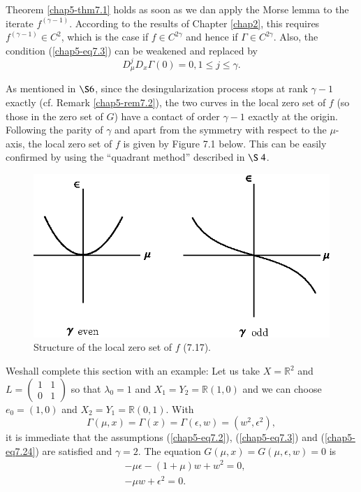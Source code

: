 \begin{remark}\label{chap5-rem7.3}
Theorem \ref{chap5-thm7.1} holds as soon as we dan apply the Morse
lemma to the iterate $f^{(\gamma - 1)}$. According to the results of
Chapter \ref{chap2}, this requires $f^{(\gamma - 1)} \in C^{2}$,
which is the case if $f \in C^{2 \gamma}$ and hence
if $\Gamma \in C^{2\gamma}$. Also, the condition
(\ref{chap5-eq7.3}) can be weakened and replaced by 
$$
D_{\mu}^{j}D_{x} \Gamma(0) = 0, 1 \leq j \leq \gamma. 
$$
\end{remark}

\begin{remark}\label{chap5-rem7.4}
As mentioned in $\S 6$, since the desingularization process stops at
rank $\gamma - 1$ exactly (cf. Remark \ref{chap5-rem7.2}), the two
curves in the local zero set of $f$ (so those in the zero set of $G$) have
a contact of order $\gamma - 1$ exactly at the origin. Following the
parity of $\gamma$ and apart from the symmetry with respect to the
$\mu$-axis, the local zero set of $f$ is given by Figure 7.1 below. This
can be easily confirmed by using the ``quadrant method'' described in
$\S\ 4$.
\end{remark}

\setcounter{figure}{0}
\begin{figure}[H]
\centering
\includegraphics{figure/fig76-7.1.eps}
\caption{Structure of the local zero set of $f$ (7.17).}
\end{figure}


We\pageoriginale shall complete this section with an example: Let us
take $X = \mathbb{R}^{2}$ and $L = \begin{pmatrix} 1 & 1\\  0 & 1 
\end{pmatrix} $ so that $\lambda_{0} = 1$ and $X_{1} = Y_{2} = \mathbb{R}(1, 0)$ and we can 
choose $e_{0} = (1, 0)$ and $X_{2} = Y_{1} = \mathbb{R}(0, 1)$. With
$$
\Gamma(\mu, x) = \Gamma(x) = \Gamma(\epsilon, w) = (w^{2}, \epsilon^{2}),
$$ 
it is immediate that the assumptions (\ref{chap5-eq7.2}),
(\ref{chap5-eq7.3}) and (\ref{chap5-eq7.24}) are satisfied and $\gamma
= 2$. The equation $G(\mu, x) = G(\mu, \epsilon, w) = 0$ is 
\begin{align*}
& - \mu \epsilon - (1 + \mu)w + w^{2} = 0,\\
& - \mu w + \epsilon^{2} = 0.\tag{7.37}\label{chap5-eq7.37}
\end{align*}

